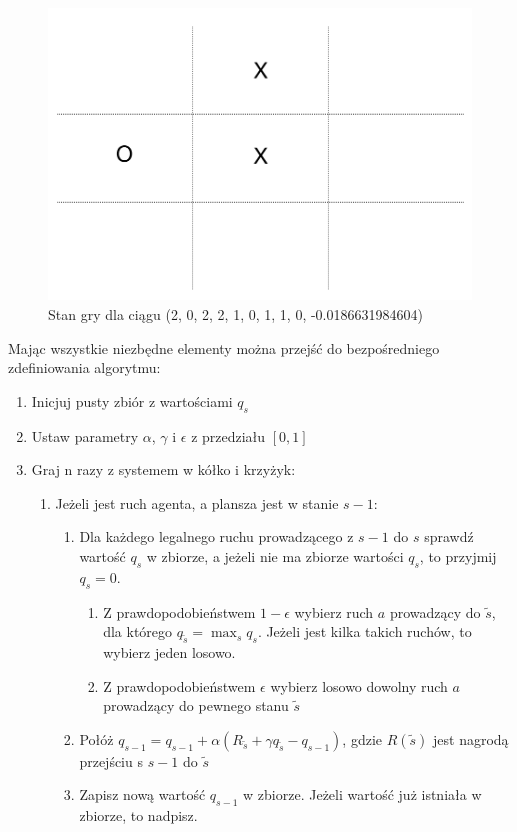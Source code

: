 \documentclass[licencjacka]{pracamgr}
\begin{document}
\begin{figure}[H]
	\includegraphics [scale=0.22] {ttt_5.png}
	\caption{Stan gry dla ciągu (2, 0, 2, 2, 1, 0, 1, 1, 0, -0.0186631984604) }
	\label{Rys13}
\end{figure}

Mając wszystkie niezbędne elementy można przejść do bezpośredniego zdefiniowania algorytmu:\\

\begin{enumerate}
	\item{Inicjuj pusty zbiór z wartościami $q_{s}$}
	\item{Ustaw parametry $\alpha$, $\gamma$  i $\epsilon$ z przedziału $[0, 1]$}
	\item{Graj n razy z systemem w kółko i krzyżyk:}
	\begin{enumerate}
		\item{Jeżeli jest ruch agenta, a plansza jest w stanie $s-1$:}
		\begin{enumerate}
			\item{Dla każdego legalnego ruchu prowadzącego z $s-1$ do $s$  sprawdź wartość $q_{s}$ w zbiorze, a jeżeli nie ma zbiorze wartości $q_{s}$, to przyjmij $q_{s}=0$.}
			\begin{enumerate}
					\item{Z prawdopodobieństwem $1-\epsilon$ wybierz ruch $a$ prowadzący do $\tilde{s}$, dla którego $q_{\tilde{s}} =\max_{s} q_{s}$. Jeżeli jest kilka takich ruchów, to wybierz jeden losowo.}
					\item{Z prawdopodobieństwem $\epsilon$ wybierz losowo dowolny ruch $a$ prowadzący do pewnego stanu $\tilde{s}$}
			\end{enumerate}
			\item{Połóż $q_{s-1} = q_{s-1} + \alpha(R_{\tilde{s}} + \gamma  q_{\tilde{s}} - q_{s-1} )$, gdzie $R(\tilde{s})$ jest nagrodą przejściu s $s-1$ do $\tilde{s}$ }
			\item{Zapisz nową wartość $q_{s-1}$ w zbiorze. Jeżeli wartość już istniała w zbiorze, to nadpisz.}
		\end{enumerate}
	\end{enumerate}
\end{enumerate}
\end{document}
